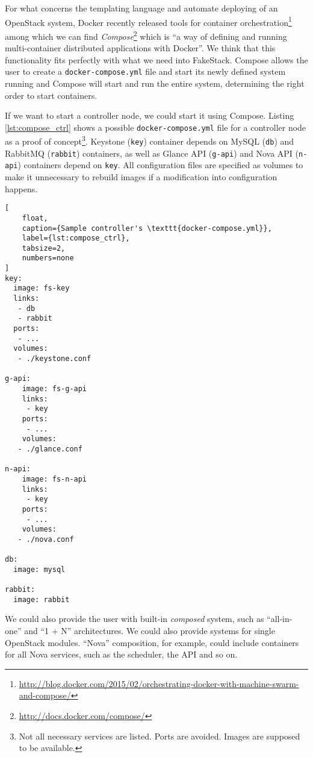 For what concerns the templating language and automate deploying of an OpenStack system, Docker recently released tools for container orchestration\footnote{\url{http://blog.docker.com/2015/02/orchestrating-docker-with-machine-swarm-and-compose/}} among which we can find \textit{Compose}\footnote{\url{http://docs.docker.com/compose/}} which is ``a way of defining and running multi-container distributed applications with Docker''. We think that this functionality fits perfectly with what we need into FakeStack. Compose allows the user to create a \texttt{docker-compose.yml} file and start its newly defined system running  and Compose will start and run the entire system, determining the right order to start containers.

If we want to start a controller node, we could start it using Compose. Listing \ref{lst:compose_ctrl} shows a possible \texttt{docker-compose.yml} file for a controller node as a proof of concept\footnote{Not all necessary services are listed. Ports are avoided. Images are supposed to be available.}. Keystone (\texttt{key}) container depends on MySQL (\texttt{db}) and RabbitMQ (\texttt{rabbit}) containers, as well as Glance API (\texttt{g-api}) and Nova API (\texttt{n-api}) containers depend on \texttt{key}. All configuration files are specified as volumes to make it unnecessary to rebuild images if a modification into configuration happens.

\begin{lstlisting}[
	float,
	caption={Sample controller's \texttt{docker-compose.yml}},
	label={lst:compose_ctrl},
	tabsize=2,
	numbers=none
]
key:
  image: fs-key
  links:
   - db
   - rabbit
  ports:
   - ...
  volumes:
   - ./keystone.conf

g-api:
	image: fs-g-api
	links:
	 - key
	ports:
	 - ...
	volumes:
   - ./glance.conf

n-api:
	image: fs-n-api
	links:
	 - key
	ports:
	 - ...
	volumes:
   - ./nova.conf

db:
  image: mysql

rabbit:
  image: rabbit
\end{lstlisting}

We could also provide the user with built-in \emph{composed} system, such as ``all-in-one'' and ``1 + N'' architectures. We could also provide systems for single OpenStack modules. ``Nova'' composition, for example, could include containers for all Nova services, such as the scheduler, the API and so on.

